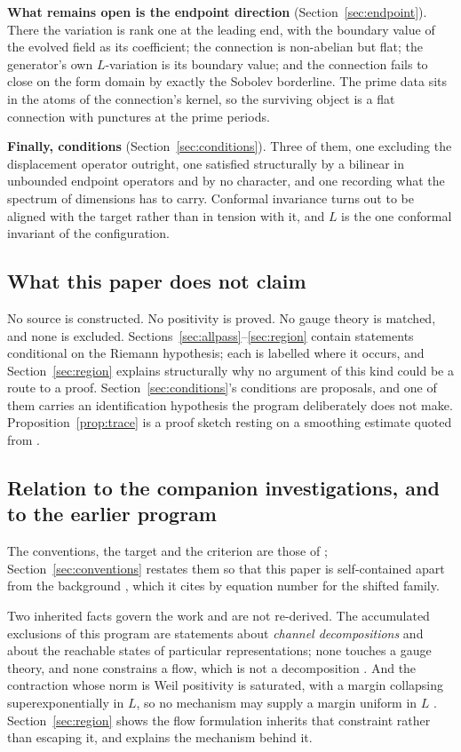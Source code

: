 \textbf{What remains open is the endpoint direction} (Section~\ref{sec:endpoint}).
There the variation is rank one at the leading end, with the boundary value of
the evolved field as its coefficient; the connection is non-abelian but flat; the
generator's own $L$-variation is its boundary value; and the connection fails to
close on the form domain by exactly the Sobolev borderline. The prime data sits
in the atoms of the connection's kernel, so the surviving object is a flat
connection with punctures at the prime periods.

\textbf{Finally, conditions} (Section~\ref{sec:conditions}). Three of them, one
excluding the displacement operator outright, one satisfied structurally by a
bilinear in unbounded endpoint operators and by no character, and one recording
what the spectrum of dimensions has to carry. Conformal invariance turns out to be
aligned with the target rather than in tension with it, and $L$ is the one
conformal invariant of the configuration.

\subsection*{What this paper does not claim}

No source is constructed. No positivity is proved. No gauge theory is matched,
and none is excluded. Sections~\ref{sec:allpass}--\ref{sec:region} contain
statements conditional on the Riemann hypothesis; each is labelled where it
occurs, and Section~\ref{sec:region} explains structurally why no argument of this
kind could be a route to a proof. Section~\ref{sec:conditions}'s conditions are
proposals, and one of them carries an identification hypothesis the program
deliberately does not make. Proposition~\ref{prop:trace} is a proof sketch resting
on a smoothing estimate quoted from \cite{Background}.

\subsection*{Relation to the companion investigations, and to the earlier program}

The conventions, the target and the criterion are those of
\cite{InverseBulk,Selection}; Section~\ref{sec:conventions} restates them so that
this paper is self-contained apart from the background \cite{Background}, which it
cites by equation number for the shifted family.

Two inherited facts govern the work and are not re-derived. The accumulated
exclusions of this program are statements about \emph{channel decompositions} and
about the reachable states of particular representations; none touches a gauge
theory, and none constrains a flow, which is not a decomposition
\cite{ExclusionMap}. And the contraction whose norm is Weil positivity is
saturated, with a margin collapsing superexponentially in $L$, so no mechanism
may supply a margin uniform in $L$ \cite{Selection}. Section~\ref{sec:region}
shows the flow formulation inherits that constraint rather than escaping it, and
explains the mechanism behind it.

